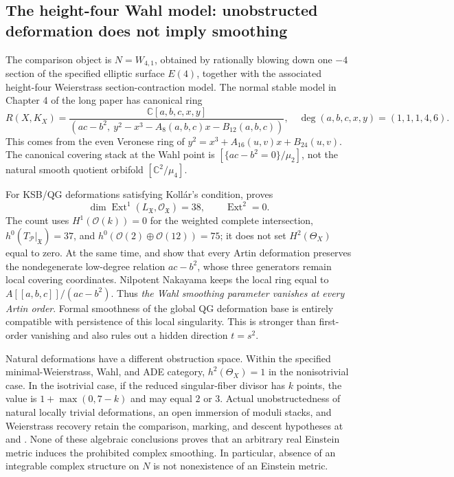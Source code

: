 \documentclass[a4paper,11pt]{article}
\numberwithin{equation}{section}
\theoremstyle{definition}
\begin{document}
\subsection{The height-four Wahl model: unobstructed deformation does not imply smoothing}\label{sec:wahl-global-scope}
The comparison object is $N=W_{4,1}$, obtained by rationally blowing down one $-4$ section of the specified elliptic surface $E(4)$, together with the associated height-four Weierstrass section-contraction model.
The normal stable model in Chapter 4 of the long paper has canonical ring
\begin{equation}\label{eq:height-four-global-ring}
 R(X,K_X)=
 \frac{\mathbb C[a,b,c,x,y]}
 {(ac-b^2,\ y^2-x^3-A_8(a,b,c)x-B_{12}(a,b,c))},
 \quad \deg(a,b,c,x,y)=(1,1,1,4,6).
\end{equation}
This comes from the even Veronese ring of $y^2=x^3+A_{16}(u,v)x+B_{24}(u,v)$.
The canonical covering stack at the Wahl point is $[\{ac-b^2=0\}/\mu_2]$, not the natural smooth quotient orbifold $[\mathbb C^2/\mu_4]$.

For KSB/QG deformations satisfying Koll\'ar's condition,  proves
\begin{equation}\label{eq:height-four-ext-dimensions}
 \dim\operatorname{Ext}^1(L_{\mathfrak X},\mathcal O_{\mathfrak X})=38,
 \qquad \operatorname{Ext}^2=0.
\end{equation}
The count uses $H^1(\mathcal O(k))=0$ for the weighted complete intersection,
$h^0(T_{\mathcal P}|_{\mathfrak X})=37$, and
$h^0(\mathcal O(2)\oplus\mathcal O(12))=75$; it does not set $H^2(\Theta_X)$ equal to zero.
At the same time,  and  show that every Artin deformation preserves the nondegenerate low-degree relation $ac-b^2$, whose three generators remain local covering coordinates.
Nilpotent Nakayama keeps the local ring equal to $A[[a,b,c]]/(ac-b^2)$.
Thus \emph{the Wahl smoothing parameter vanishes at every Artin order}.
Formal smoothness of the global QG deformation base is entirely compatible with persistence of this local singularity.
This is stronger than first-order vanishing and also rules out a hidden direction $t=s^2$.

Natural deformations have a different obstruction space.
Within the specified minimal-Weierstrass, Wahl, and ADE category, $h^2(\Theta_X)=1$ in the nonisotrivial case.
In the isotrivial case, if the reduced singular-fiber divisor has $k$ points, the value is $1+\max(0,7-k)$ and may equal $2$ or $3$.
Actual unobstructedness of natural locally trivial deformations, an open immersion of moduli stacks, and Weierstrass recovery retain the comparison, marking, and descent hypotheses at  and .
None of these algebraic conclusions proves that an arbitrary real Einstein metric induces the prohibited complex smoothing.
In particular, absence of an integrable complex structure on $N$ is not nonexistence of an Einstein metric.
\end{document}
